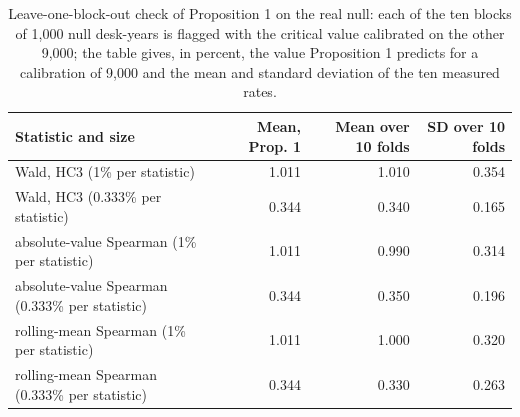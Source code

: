 \begin{table}[htbp]
\centering
\footnotesize
\caption{Leave-one-block-out check of Proposition 1 on the real null: each of the ten blocks of 1,000 null desk-years is flagged with the critical value calibrated on the other 9,000; the table gives, in percent, the value Proposition 1 predicts for a calibration of 9,000 and the mean and standard deviation of the ten measured rates.}
\label{tab:theory-loo}
\begin{tabular}{>{\raggedright\arraybackslash}p{6.4cm}rrr}
\toprule
Statistic and size & Mean, Prop. 1 & Mean over 10 folds & SD over 10 folds \\
\midrule
\relax Wald, HC3 (1\% per statistic) & 1.011 & 1.010 & 0.354 \\
\relax Wald, HC3 (0.333\% per statistic) & 0.344 & 0.340 & 0.165 \\
\relax absolute-value Spearman (1\% per statistic) & 1.011 & 0.990 & 0.314 \\
\relax absolute-value Spearman (0.333\% per statistic) & 0.344 & 0.350 & 0.196 \\
\relax rolling-mean Spearman (1\% per statistic) & 1.011 & 1.000 & 0.320 \\
\relax rolling-mean Spearman (0.333\% per statistic) & 0.344 & 0.330 & 0.263 \\
\bottomrule
\end{tabular}
\end{table}
